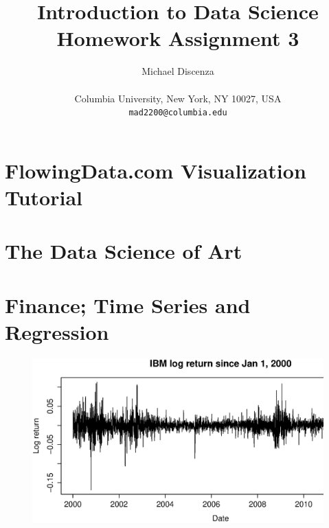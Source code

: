 \documentclass{article}
\title{Introduction to Data Science\\Homework Assignment 3}
\author{
Michael Discenza\\\\
Columbia University, New York, NY 10027, USA \\
\texttt{mad2200@columbia.edu}
}
\begin{document}
\maketitle




\section{FlowingData.com Visualization Tutorial}

\section{The Data Science of Art}


\section{Finance; Time Series and Regression}

\begin{figure}[H]
\begin{center}
\includegraphics[width=1\columnwidth]{IBM_log_return.eps}
\caption{}
\end{center}
\end{figure}
\end{document}
